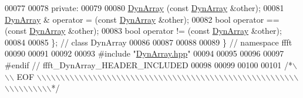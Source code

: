 \begin{DoxyCode}
00077 
00078 \textcolor{keyword}{private}:
00079 
00080                         \hyperlink{a00007_a3a1bc9474a3891360464c4ad97d846ff}{DynArray} (\textcolor{keyword}{const} \hyperlink{a00007}{DynArray} &other);
00081     \hyperlink{a00007}{DynArray} &      operator = (\textcolor{keyword}{const} \hyperlink{a00007}{DynArray} &other);
00082     \textcolor{keywordtype}{bool}                operator == (\textcolor{keyword}{const} \hyperlink{a00007}{DynArray} &other);
00083     \textcolor{keywordtype}{bool}                operator != (\textcolor{keyword}{const} \hyperlink{a00007}{DynArray} &other);
00084 
00085 \};  \textcolor{comment}{// class DynArray}
00086 
00087 
00088 
00089 \}   \textcolor{comment}{// namespace ffft}
00090 
00091 
00092 
00093 \textcolor{preprocessor}{#include    "\hyperlink{a00092}{DynArray.hpp}"}
00094 
00095 
00096 
00097 \textcolor{preprocessor}{#endif  // ffft\_DynArray\_HEADER\_INCLUDED}
00098 
00099 
00100 
00101 \textcolor{comment}{/*\(\backslash\)\(\backslash\)\(\backslash\) EOF \(\backslash\)\(\backslash\)\(\backslash\)\(\backslash\)\(\backslash\)\(\backslash\)\(\backslash\)\(\backslash\)\(\backslash\)\(\backslash\)\(\backslash\)\(\backslash\)\(\backslash\)\(\backslash\)\(\backslash\)\(\backslash\)\(\backslash\)\(\backslash\)\(\backslash\)\(\backslash\)\(\backslash\)\(\backslash\)\(\backslash\)\(\backslash\)\(\backslash\)\(\backslash\)\(\backslash\)\(\backslash\)\(\backslash\)\(\backslash\)\(\backslash\)\(\backslash\)\(\backslash\)\(\backslash\)\(\backslash\)\(\backslash\)\(\backslash\)\(\backslash\)\(\backslash\)\(\backslash\)\(\backslash\)\(\backslash\)\(\backslash\)\(\backslash\)\(\backslash\)\(\backslash\)\(\backslash\)\(\backslash\)\(\backslash\)\(\backslash\)\(\backslash\)\(\backslash\)\(\backslash\)\(\backslash\)\(\backslash\)\(\backslash\)\(\backslash\)\(\backslash\)\(\backslash\)\(\backslash\)\(\backslash\)\(\backslash\)\(\backslash\)\(\backslash\)\(\backslash\)\(\backslash\)*/}
\end{DoxyCode}
